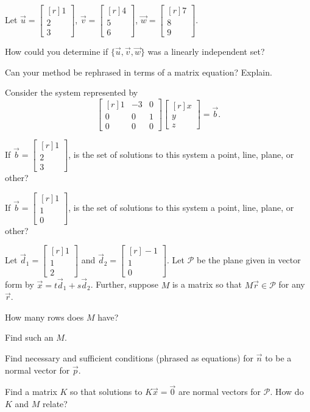 \documentclass{problemset}
\newcommand{\mat}[1]{\begin{bmatrix*}[r]#1\end{bmatrix*}}
\begin{document}
	\question
	Let $\vec u=\mat{1\\2\\3}$, $\vec v=\mat{4\\5\\6}$, $\vec w=\mat{7\\8\\9}$.
	\begin{parts}
		\item How could you determine if $\{\vec u,\vec v,\vec w\}$ was a linearly
			independent set?
		\item Can your method be rephrased in terms of a matrix equation? Explain.
	\end{parts}


	\question
	Consider the system represented by
	\[
		\mat{1&-3&0\\0&0&1\\0&0&0}\mat{x\\y\\z}=\vec b.
	\]
	\begin{parts}
		\item If $\vec b=\mat{1\\2\\3}$, is the set of solutions to this system a 
		point, line, plane, or other?
		\item If $\vec b=\mat{1\\1\\0}$, is the set of solutions to this system a 
		point, line, plane, or other?
	\end{parts}

	\question
	Let $\vec d_1=\mat{1\\1\\2}$ and
	$\vec d_2=\mat{-1\\1\\0}$. 
	Let $\mathcal P$ be the plane given in vector form by $\vec x=t\vec d_1+s\vec d_2$.
	Further, suppose $M$ is a matrix so that $M\vec r\in\mathcal P$ for any $\vec r$.
	\begin{parts}
		\item How many rows does $M$ have?
		\item Find such an $M$.
		\item Find necessary and sufficient conditions (phrased as equations) for $\vec n$
			to be a normal vector for $\vec p$.
		\item Find a matrix $K$ so that solutions
			to $K\vec x=\vec 0$ are normal vectors for $\mathcal P$.
			How do $K$ and $M$ relate?
	\end{parts}
\end{document}
